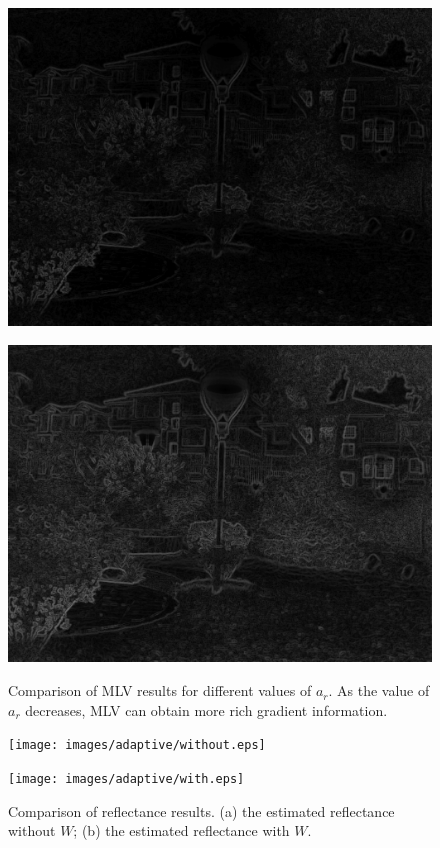 \begin{figure}[tb]
\centering
\begin{minipage}[b]{0.49\hsize}
\centering
\includegraphics[height=0.65\hsize]{images/noise/MLV_10.eps}
 \label{fig:mlv_normal}
\end{minipage}
\begin{minipage}[b]{0.49\hsize}
\centering
\includegraphics[height=0.65\hsize]{images/noise/MLV_05.eps}
 \label{fig:mlv_pow}
\end{minipage}
\caption{Comparison of MLV results for different values of $a_{r}$. As the value of $a_{r}$ decreases, MLV can obtain more rich gradient information.}
\label{fig:mlv_change}
\end{figure}
\begin{figure}[tb]
\centering
\begin{minipage}[b]{0.49\hsize}
\centering
\texttt{[image: images/adaptive/without.eps]}
 \label{fig:wo}
\end{minipage}
\begin{minipage}[b]{0.49\hsize}
\centering
\texttt{[image: images/adaptive/with.eps]}
 \label{fig:w}
\end{minipage}
\caption{Comparison of reflectance results. (a) the estimated reflectance without $W$; (b) the estimated reflectance with $W$.}
\label{fig:adaptive/effectiveness}
\end{figure}
